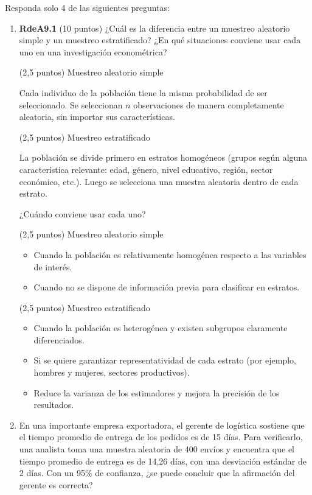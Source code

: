 \documentclass[10pt,a4paper]{article}
\begin{document}
Responda solo 4 de las siguientes preguntas: 
\begin{enumerate}
   \item \textbf{RdeA9.1} (10 puntos) 
¿Cuál es la diferencia entre un muestreo aleatorio simple y un muestreo estratificado? ¿En qué situaciones conviene usar cada uno en una investigación econométrica?
 
{\color{blue}(2,5 puntos) Muestreo aleatorio simple 

Cada individuo de la población tiene la misma probabilidad de ser seleccionado. 
Se seleccionan $n$ observaciones de manera completamente aleatoria, sin importar sus características.

(2,5 puntos) Muestreo estratificado

La población se divide primero en estratos homogéneos (grupos según alguna característica relevante: 
edad, género, nivel educativo, región, sector económico, etc.). 
Luego se selecciona una muestra aleatoria dentro de cada estrato.

¿Cuándo conviene usar cada uno?

(2,5 puntos) Muestreo aleatorio simple
\begin{itemize}
    \item Cuando la población es relativamente homogénea respecto a las variables de interés.
    \item Cuando no se dispone de información previa para clasificar en estratos.
  
\end{itemize}

(2,5 puntos) Muestreo estratificado
\begin{itemize}
    \item Cuando la población es heterogénea y existen subgrupos claramente diferenciados.
    \item Si se quiere garantizar representatividad de cada estrato (por ejemplo, hombres y mujeres, sectores productivos).
    \item Reduce la varianza de los estimadores y mejora la precisión de los resultados.
\end{itemize}}

    \item 
En una importante empresa exportadora, el gerente de logística sostiene que el tiempo promedio de entrega de los pedidos es de 15 días.  
Para verificarlo, una analista toma una muestra aleatoria de 400 envíos y encuentra que el tiempo promedio de entrega es de 14,26 días, con una desviación estándar de 2 días.  
Con un 95\% de confianza, ¿se puede concluir que la afirmación del gerente es correcta?



\end{enumerate}
\end{document}

